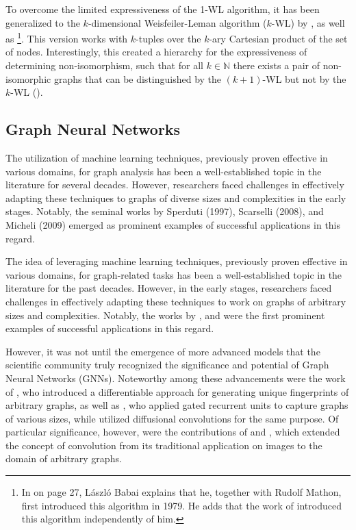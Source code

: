 To overcome the limited expressiveness of the 1-WL algorithm, it has been generalized to the $k$-dimensional Weisfeiler-Leman algorithm ($k$-WL) by \cite{Bab1979, Babai2016}, as well as \cite{Imm+1990}\footnote{In \cite{Babai2016} on page 27, László Babai explains that he, together with Rudolf Mathon, first introduced this algorithm in 1979. He adds that the work of \cite{Imm+1990} introduced this algorithm independently of him.}. This version works with $k$-tuples over the $k$-ary Cartesian product of the set of nodes. Interestingly, this created a hierarchy for the expressiveness of determining non-isomorphism, such that for all $k \in \mathbb{N}$ there exists a pair of non-isomorphic graphs that can be distinguished by the $(k+1)$-WL but not by the $k$-WL (\cite{Cai1992}).

\subsection{Graph Neural Networks}
The utilization of machine learning techniques, previously proven effective in various domains, for graph analysis has been a well-established topic in the literature for several decades. However, researchers faced challenges in effectively adapting these techniques to graphs of diverse sizes and complexities in the early stages. Notably, the seminal works by Sperduti (1997), Scarselli (2008), and Micheli (2009) emerged as prominent examples of successful applications in this regard.


The idea of leveraging machine learning techniques, previously proven effective in various domains, for graph-related tasks has been a well-established topic in the literature for the past decades. However, in the early stages, researchers faced challenges in effectively adapting these techniques to work on graphs of arbitrary sizes and complexities. Notably, the works by \cite{Sperduti1997,Scarselli2008}, and \cite{Micheli2009} were the first prominent examples of successful applications in this regard.

However, it was not until the emergence of more advanced models that the scientific community truly recognized the significance and potential of Graph Neural Networks (GNNs). Noteworthy among these advancements were the work of \cite{Duvenaud2015}, who introduced a differentiable approach for generating unique fingerprints of arbitrary graphs, as well as \cite{Li2015}, who applied gated recurrent units to capture graphs of various sizes, while \cite{Atwood2016} utilized diffusional convolutions for the same purpose. Of particular significance, however, were the contributions of \cite{Bruna2013,Defferrard2016} and \cite{Kip+2017}, which extended the concept of convolution from its traditional application on images to the domain of arbitrary graphs.

